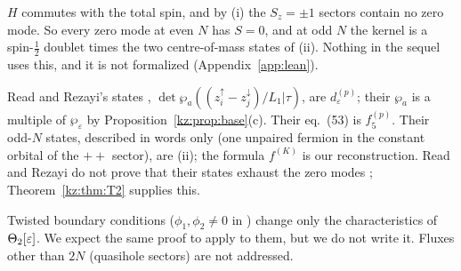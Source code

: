 \begin{remark}[spin]\label{kz:rem:spin}
$H$ commutes with the total spin, and by (i) the $S_z=\pm1$ sectors contain no zero mode. So every zero mode at even $N$
has $S=0$, and at odd $N$ the kernel is a spin-$\tfrac12$ doublet times the two centre-of-mass states of (ii). Nothing in
the sequel uses this, and it is not formalized (Appendix~\ref{app:lean}).
\end{remark}

\begin{remark}
Read and Rezayi's states \cite[eq.~(52)]{RR96}, $\det\wp_a((z_i^\uparrow-z_j^\downarrow)/L_1|\tau)$, are $d^{(p)}_\varepsilon$; their $\wp_a$ is a multiple of
$\wp_\varepsilon$ by Proposition~\ref{kz:prop:base}(c). Their eq.~(53) is $f_5^{(p)}$. Their odd-$N$ states, described in
words only (one unpaired fermion in the constant orbital of the $++$ sector), are (ii); the formula $f^{(K)}$ is
our reconstruction. Read and Rezayi do not prove that their states exhaust the zero modes \cite[Section~V]{RR96};
Theorem~\ref{kz:thm:T2} supplies this.
\end{remark}

\begin{remark}
Twisted boundary conditions ($\phi_1,\phi_2\neq0$ in \cite[eq.~(45)]{RR96}) change only the characteristics of
$\Theta_2[\varepsilon]$. We expect the same proof to apply to them, but we do not write it. Fluxes other than $2N$
(quasihole sectors) are not addressed.
\end{remark}
\endgroup
